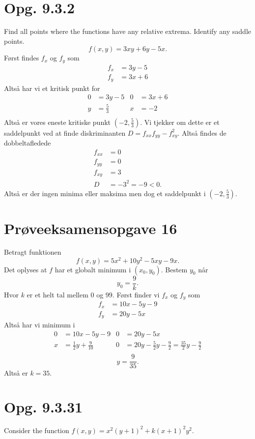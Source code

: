 \documentclass[12pt]{article}
\theoremstyle{definition}
\begin{document}
\section*{Opg. 9.3.2}
Find all points where the functions have any relative extrema. Identify any saddle points.
\[ 
f(x,y) = 3xy + 6y-5x
.\]
\bigbreak
Først findes $f_x$ og $f_y$ som
\begin{align*}
  f_x &= 3y - 5 \\
  f_y &= 3x + 6 
\end{align*}
Altså har vi et kritisk punkt for
\begin{align*}
  0 &= 3y - 5  & 0 &= 3x + 6\\
  y &= \frac{5}{3} & x &= -2\\
\end{align*}
Altså er vores eneste kritiske punkt $(-2, \frac{5}{3})$. Vi tjekker om dette er et saddelpunkt ved at finde diskriminanten $D = f_{x x}f_{yy} - f_{xy}^2$. Altså findes de dobbeltafledede
\begin{align*}
  f_{x x} &= 0 \\
  f_{yy} &= 0 \\
  f_{xy} &= 3 \\
  D &= -3^2 = -9 < 0
.\end{align*}
Altså er der ingen minima eller maksima men dog et saddelpunkt i $(-2, \frac{5}{3})$.

\section*{Prøveeksamensopgave 16}
Betragt funktionen
\[ 
f(x,y) = 5x^2 + 10y^2 - 5xy -9x
.\]
Det oplyses at $f$ har et globalt minimum i $(x_0, y_0)$. Bestem $y_0$ når
\[ 
y_0 = \frac{9}{k}
.\]
Hvor $k$ er et helt tal mellem $0$ og $99$.
\bigbreak
Først finder vi $f_x$ og $f_y$ som
\begin{align*}
  f_x &= 10x - 5y - 9 \\
  f_y &= 20y - 5x
\end{align*}
Altså har vi minimum i
\begin{align*}
  0 &= 10x - 5y -9 & 0 &= 20y - 5x \\
  x &= \frac{1}{2}y + \frac{9}{10} & 0 &= 20y - \frac{5}{2}y - \frac{9}{2} = \frac{35}{2}y -  \frac{9}{2} \\
\end{align*}
\[ 
y = \frac{9}{35}
.\]
Altså er $k = 35$.

\section*{Opg. 9.3.31}
Consider the function $f(x,y) = x^2(y+1)^2 + k(x+1)^2y^2$.
\end{document}

